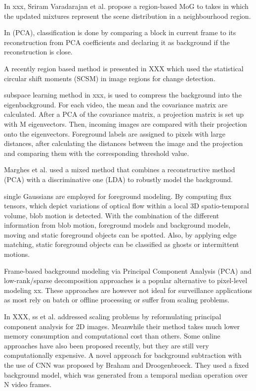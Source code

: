 \documentclass[journal]{IEEEtran}
\begin{document}
In xxx, Sriram Varadarajan et al.
propose a region-based MoG to takes in which the updated mixtures represent the scene distribution in a neighbourhood region.

In (PCA), classification is done by comparing a block in current frame to its reconstruction from PCA coefficients and declaring it as background if the reconstruction is close.

A recently region based method is presented in XXX which used the statistical circular shift moments (SCSM) in image regions for change detection.

subspace learning method in xxx, is used to compress the background into the eigenbackground.
For each video, the mean and the covariance matrix are calculated.
After a PCA of the covariance matrix, a projection matrix is set up with M eigenvectors.
Then, incoming images are compared with their projection onto the eigenvectors.
Foreground labels are assigned to pixels with large distances, after calculating the distances between the image and the projection and comparing them with the corresponding threshold value.

Marghes et al.
used a mixed method that combines a reconstructive method (PCA) with a discriminative one (LDA) to robustly model the background.

single Gaussians are employed for foreground modeling.
By computing flux tensors, which depict variations of optical flow within a local 3D spatio-temporal volume, blob motion is detected.
With the combination of the different information from blob motion, foreground models and background models, moving and static foreground objects can be spotted.
Also, by applying edge matching, static foreground objects can be classified as ghosts or intermittent motions.

Frame-based background modeling via Principal Component Analysis (PCA) and low-rank/sparse decomposition approaches is a popular alternative to pixel-level modeling xx.
These approaches are however not ideal for surveillance applications as most rely on batch or offline processing or suffer from scaling problems.

In XXX, ss et al.
addressed scaling problems by reformulating principal component analysis for 2D images.
Meanwhile their method takes much lower memory consumption and computational cost than others.
Some online approaches have also been proposed recently, but they are still very computationally expensive.
\label{sec_sup}
A novel approach for background subtraction with the use of CNN was proposed by Braham and Droogenbroeck.
They used a fixed background model, which was generated from a temporal median operation over N video frames.
\end{document}
